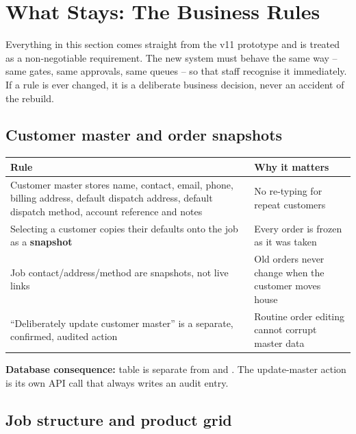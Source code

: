 \section{What Stays: The Business Rules}\label{sec:keeps}

\begin{plainwords}
Everything in this section comes straight from the v11 prototype and is treated as a
non-negotiable requirement. The new system must behave the same way -- same gates, same
approvals, same queues -- so that staff recognise it immediately. If a rule is ever
changed, it is a deliberate business decision, never an accident of the rebuild.
\end{plainwords}

\subsection{Customer master and order snapshots}

\begin{tabularx}{\textwidth}{@{}X X@{}}
\toprule
\textbf{Rule} & \textbf{Why it matters} \\
\midrule
Customer master stores name, contact, email, phone, billing address, default dispatch
  address, default dispatch method, account reference and notes &
  No re-typing for repeat customers \\
Selecting a customer copies their defaults onto the job as a \textbf{snapshot} &
  Every order is frozen as it was taken \\
Job contact/address/method are snapshots, not live links &
  Old orders never change when the customer moves house \\
``Deliberately update customer master'' is a separate, confirmed, audited action &
  Routine order editing cannot corrupt master data \\
\bottomrule
\end{tabularx}

\textbf{Database consequence:}  table is separate from
 and . The update-master
action is its own API call that always writes an audit entry.

\subsection{Job structure and product grid}

